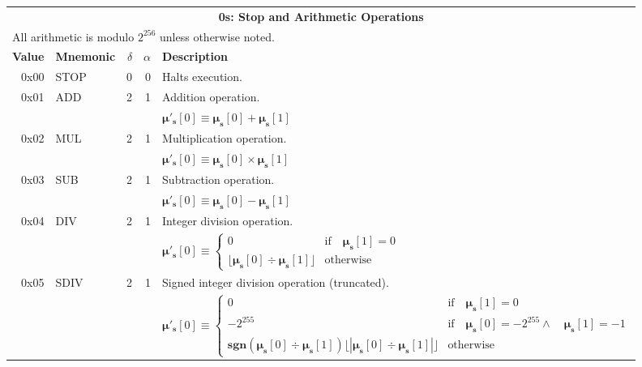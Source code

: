 \documentclass[9pt,oneside]{amsart}
\begin{document}
\begin{tabular*}{\columnwidth}[h]{rlrrl}
\toprule
\multicolumn{5}{c}{\textbf{0s: Stop and Arithmetic Operations}} \\
\multicolumn{5}{l}{All arithmetic is modulo $2^{256}$ unless otherwise noted.} \vspace{5pt} \\
\textbf{Value} & \textbf{Mnemonic} & $\delta$ & $\alpha$ & \textbf{Description} \vspace{5pt} \\
0x00 & {\small STOP} & 0 & 0 & Halts execution. \\
\midrule
0x01 & {\small ADD} & 2 & 1 & Addition operation. \\
&&&& $\boldsymbol{\mu}'_\mathbf{s}[0] \equiv \boldsymbol{\mu}_\mathbf{s}[0] + \boldsymbol{\mu}_\mathbf{s}[1]$ \\
\midrule
0x02 & {\small MUL} & 2 & 1 & Multiplication operation. \\
&&&& $\boldsymbol{\mu}'_\mathbf{s}[0] \equiv \boldsymbol{\mu}_\mathbf{s}[0] \times \boldsymbol{\mu}_\mathbf{s}[1]$ \\
\midrule
0x03 & {\small SUB} & 2 & 1 & Subtraction operation. \\
&&&& $\boldsymbol{\mu}'_\mathbf{s}[0] \equiv \boldsymbol{\mu}_\mathbf{s}[0] - \boldsymbol{\mu}_\mathbf{s}[1]$ \\
\midrule
0x04 & {\small DIV} & 2 & 1 & Integer division operation. \\
&&&& $\boldsymbol{\mu}'_\mathbf{s}[0] \equiv \begin{cases}0 & \text{if} \quad \boldsymbol{\mu}_\mathbf{s}[1] = 0\\ \lfloor\boldsymbol{\mu}_\mathbf{s}[0] \div \boldsymbol{\mu}_\mathbf{s}[1]\rfloor & \text{otherwise}\end{cases}$  \\
\midrule
0x05 & {\small SDIV} & 2 & 1 & Signed integer division operation (truncated). \\
&&&& $\boldsymbol{\mu}'_\mathbf{s}[0] \equiv \begin{cases}0 & \text{if} \quad \boldsymbol{\mu}_\mathbf{s}[1] = 0\\ -2^{255} & \text{if} \quad \boldsymbol{\mu}_\mathbf{s}[0] = -2^{255} \wedge \quad \boldsymbol{\mu}_\mathbf{s}[1] = -1\\ \mathbf{sgn} (\boldsymbol{\mu}_\mathbf{s}[0] \div \boldsymbol{\mu}_\mathbf{s}[1]) \lfloor |\boldsymbol{\mu}_\mathbf{s}[0] \div \boldsymbol{\mu}_\mathbf{s}[1]| \rfloor & \text{otherwise}\end{cases}$  \\

\end{tabular*}
\end{document}
